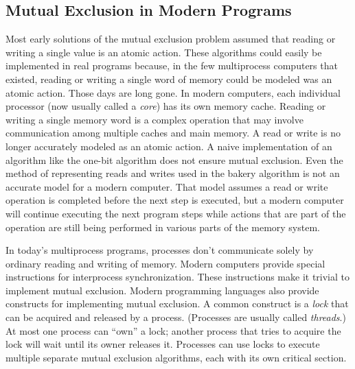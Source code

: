\documentclass[fleqn,leqno]{article}
\begin{document}
%
\subsection{Mutual Exclusion in Modern Programs}

Most early solutions of the mutual exclusion problem assumed that
reading or writing a single value is an atomic action.  These
algorithms could easily be implemented in real programs because, in
the few multiprocess computers that existed, reading or writing a
single word of memory could be modeled was an atomic action.  Those
days are long gone.  In modern computers, each individual processor
(now usually called a \emph{core}) has its own memory cache.  Reading
or writing a single memory word is a complex operation that may
involve communication among multiple caches and main memory.  A read
or write is no longer accurately modeled as an atomic action.  A naive
implementation of an algorithm like the one-bit algorithm does not
ensure mutual exclusion.  Even the method of representing reads and
writes used in the bakery algorithm is not an accurate model for a
modern computer.  That model assumes a read or write operation is
completed before the next step is executed, but a modern computer will
continue executing the next program steps while actions that are part
of the operation are still being performed in various parts of the
memory system.

In today's multiprocess programs, processes don't communicate solely
by ordinary reading and writing of memory.  Modern computers provide
special instructions for interprocess synchronization.  These
instructions make it trivial to implement mutual exclusion.  Modern
programming languages also provide constructs for implementing mutual
exclusion.  A common construct is a 
\emph{lock} that can be acquired
and released by a process.  (Processes are usually called
\emph{threads}.)  At most one process can ``own'' a lock; another
process that tries to acquire the lock will wait until its owner
releases it.  Processes can use locks to execute multiple separate
mutual exclusion algorithms, each with its own critical section.
\end{document}
